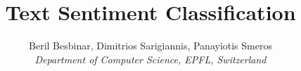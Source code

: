 \documentclass[10pt,conference,compsocconf]{IEEEtran}
\begin{document}
\title{Text Sentiment Classification}

\author{Beril Besbinar, Dimitrios Sarigiannis, Panayiotis Smeros\\
\textit{Department of Computer Science, EPFL, Switzerland}}

\maketitle














\cleardoublepage


\end{document}
